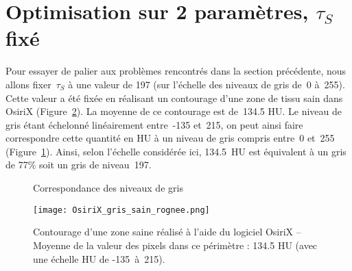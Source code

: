 \documentclass[main.tex]{subfiles}
\begin{document}
\section{Optimisation sur 2 paramètres, $\tau_S$ fixé \label{sec:optim_2_param}}
Pour essayer de palier aux problèmes rencontrés dans la section précédente, nous allons fixer~$\tau_S$ à une valeur de 197 (sur l'échelle des niveaux de gris de~0 à~255). Cette valeur a été fixée en réalisant un contourage d'une zone de tissu sain dans OsiriX (\cf  Figure~\ref{fig:contourage_sain}). La moyenne de ce contourage est de~134.5 HU. Le niveau de gris étant échelonné linéairement entre~-135 et~215, on peut ainsi faire correspondre cette quantité en HU à un niveau de gris compris entre~0 et~255 (\cf Figure~\ref{fig:schema_correspondance_gris}). Ainsi, selon l'échelle considérée ici, 134.5~HU est  équivalent à un gris de 77\% soit un gris de niveau~197.

\begin{figure}
\centering

\caption{\label{fig:schema_correspondance_gris} Correspondance des niveaux de gris }
\end{figure}


\begin{figure}
\texttt{[image: OsiriX\_gris\_sain\_rognee.png]}
\caption{\label{fig:contourage_sain}Contourage d'une zone saine réalisé à l'aide du logiciel OsiriX -- Moyenne de la valeur des pixels dans ce périmètre : 134.5 HU (avec une échelle HU de \mbox{-135 à 215}).}
\end{figure}

\end{document}
